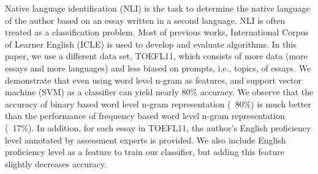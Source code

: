 Native language identification (NLI) is the task to determine the native language of the author based on an essay written in a second language.             
 NLI is
 often treated as a classification problem.  Most of previous works,
 International Corpus of Learner English (ICLE) is used to develop and evaluate
 algorithms.  In this paper, we use a different data set, TOEFL11, which
 consists of more data (more essays and more languages) and less biased on
 prompts, i.e., topics, of essays.  We demonstrate that even using word level
 n-gram as features, and support vector machine (SVM) as a classifier can yield
 nearly 80\% accuracy. We observe that the accuracy of binary based word level
 n-gram representation (~80\%) is much better than the performance of frequency
 based word level n-gram representation (~17\%).              In addition, for each
 essay
 in TOEFL11, the author's English proficiency level annotated by assessment
 experts is provided.  We also include English proficiency level as a feature
 to train our classifier, but adding this feature slightly decreases accuracy.

